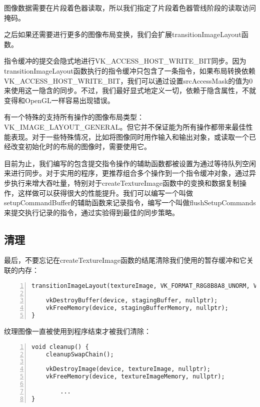 \documentclass{ctexart}
\begin{document}
图像数据需要在片段着色器读取，所以我们指定了片段着色器管线阶段的读取访问掩码。

之后如果还需要进行更多的图像布局变换，我们会扩展transitionImageLayout函数。

指令缓冲的提交会隐式地进行VK\_ACCESS\_HOST\_WRITE\_BIT同步。因为transitionImageLayout函数执行的指令缓冲只包含了一条指令，如果布局转换依赖VK\_ACCESS\_HOST\_WRITE\_BIT，我们可以通过设置srcAccessMask的值为0来使用这一隐含的同步。不过，我们最好显式地定义一切，依赖于隐含属性，不就变得和OpenGL一样容易出现错误。

有一个特殊的支持所有操作的图像布局类型：VK\_IMAGE\_LAYOUT\_GENERAL。但它并不保证能为所有操作都带来最佳性能表现。对于一些特殊情况，比如将图像同时用作输入和输出对象，或读取一个已经改变初始化时的布局的图像时，需要使用它。

目前为止，我们编写的包含提交指令操作的辅助函数都被设置为通过等待队列空闲来进行同步。对于实用的程序，更推荐组合多个操作到一个指令缓冲对象，通过异步执行来增大吞吐量，特别对于createTextureImage函数中的变换和数据复制操作，这样做可以获得很大的性能提升。我们可以编写一个叫做setupCommandBuffer的辅助函数来记录指令，编写一个叫做flushSetupCommands来提交执行记录的指令，通过实验得到最佳的同步策略。

\subsection{清理}

最后，不要忘记在createTextureImage函数的结尾清除我们使用的暂存缓冲和它关联的内存：

\begin{lstlisting}[language={[ANSI]C},keywordstyle=\color{blue!70},commentstyle=\color{red!50!green!50!blue!50},frame=shadowbox, rulesepcolor=\color{red!20!green!20!blue!20},basicstyle=\small,numbers=left, numberstyle=\tiny,breaklines=true]
	transitionImageLayout(textureImage, VK_FORMAT_R8G8B8A8_UNORM, VK_IMAGE_LAYOUT_TRANSFER_DST_OPTIMAL, VK_IMAGE_LAYOUT_SHADER_READ_ONLY_OPTIMAL);

	vkDestroyBuffer(device, stagingBuffer, nullptr);
	vkFreeMemory(device, stagingBufferMemory, nullptr);
}
\end{lstlisting}

纹理图像一直被使用到程序结束才被我们清除：

\begin{lstlisting}[language={[ANSI]C},keywordstyle=\color{blue!70},commentstyle=\color{red!50!green!50!blue!50},frame=shadowbox, rulesepcolor=\color{red!20!green!20!blue!20},basicstyle=\small,numbers=left, numberstyle=\tiny,breaklines=true]
void cleanup() {
	cleanupSwapChain();

	vkDestroyImage(device, textureImage, nullptr);
	vkFreeMemory(device, textureImageMemory, nullptr);

		...
}
\end{lstlisting}
\end{document}
